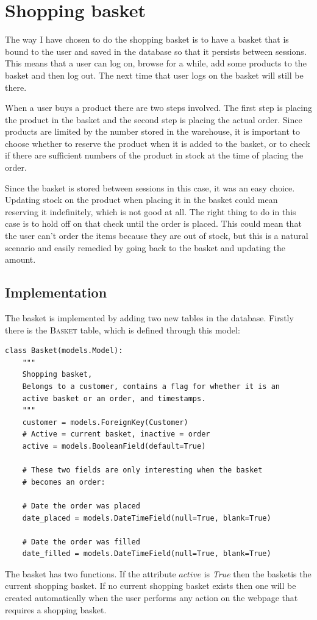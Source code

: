 \documentclass[12pt, a4paper,titlepage]{article}
\begin{document}
\section{Shopping basket}
The way I have chosen to do the shopping basket is to have a basket that is
bound to the user and saved in the database so that it persists between
sessions.
This means that a user can log on, browse for a while, add some products to
the basket and then log out. The next time that user logs on the basket will
still be there.

When a user buys a product there are two steps involved. The first step is
placing the product in the basket and the second step is placing the actual
order. Since products are limited by the number stored in the warehouse,
it is important to choose whether to reserve the product when it is added
to the basket, or to check if there are sufficient numbers of the product in 
stock at the time of placing the order.

Since the basket is stored between sessions in this case, it was an easy choice.
Updating stock on the product when placing it in the basket could mean
reserving it indefinitely, which is not good at all.
The right thing to do in this case is to hold off on that check until the order
is placed. This could mean that the user can't order the items because they
are out of stock, but this is a natural scenario and easily remedied by going
back to the basket and updating the amount.

\subsection{Implementation}
The basket is implemented by adding two new tables in the database.
Firstly there is the \textsc{Basket} table, which is defined through this model:
\begin{lstlisting}
class Basket(models.Model):
	"""
	Shopping basket, 
	Belongs to a customer, contains a flag for whether it is an 
	active basket or an order, and timestamps.
	"""
	customer = models.ForeignKey(Customer)
	# Active = current basket, inactive = order
	active = models.BooleanField(default=True) 

	# These two fields are only interesting when the basket 
	# becomes an order:

	# Date the order was placed
	date_placed = models.DateTimeField(null=True, blank=True) 

	# Date the order was filled 
	date_filled = models.DateTimeField(null=True, blank=True) 
\end{lstlisting}
The basket has two functions. If the attribute $active$ is \emph{True} then 
the basketis the current shopping basket. 
If no current shopping basket exists then one will be created automatically
when the user performs any action on the webpage that requires a shopping basket.
\end{document}
